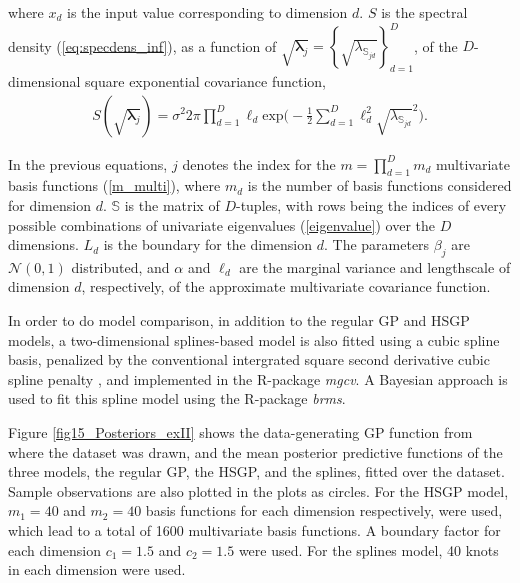 \documentclass[]{interact}
\theoremstyle{plain}%
\theoremstyle{definition}
\theoremstyle{remark}
\begin{document}
\noindent where $x_d$ is the input value corresponding to dimension $d$. $S$ is the spectral density (\ref{eq:specdens_inf}), as a function of $\sqrt{\bm{\lambda}_j}= \left\{ \sqrt{\lambda_{\mathbb{S}_{jd}}} \right\}_{d=1}^{D}$, of the $D$-dimensional square exponential covariance function,
%
\begin{eqnarray*}
S(\sqrt{\bm{\lambda}_j})= \sigma^2 2\pi \prod_{d=1}^D \ell_d  \mathrm{exp}\bigg(-\frac{1}{2} \sum_{d=1}^D \ell_d^2  \sqrt{\lambda_{\mathbb{S}_{jd}}}^2 \bigg). 
\end{eqnarray*}

\noindent In the previous equations, $j$ denotes the index for the $m= \prod_{d=1}^{D} m_d$ multivariate basis functions (\ref{m_multi}), where $m_d$ is the number of basis functions considered for dimension $d$. $\mathbb{S}$ is the matrix of $D$-tuples, with rows being the indices of every possible combinations of univariate eigenvalues (\ref{eigenvalue}) over the $D$ dimensions. $L_d$ is the boundary for the dimension $d$. The parameters $\beta_j$ are $\mathcal{N}(0,1)$ distributed, and $\alpha$ and $\ell_d$ are the marginal variance and lengthscale of dimension $d$, respectively, of the approximate multivariate covariance function.


In order to do model comparison, in addition to the regular GP and HSGP models, a two-dimensional splines-based model is also fitted using a cubic spline basis, penalized by the conventional intergrated square second derivative cubic spline penalty \citep{wood2017generalized}, and implemented in the R-package \textit{mgcv}. A Bayesian approach is used to fit this spline model using the R-package \textit{brms}.

Figure \ref{fig15_Posteriors_exII} shows the data-generating GP function from where the dataset was drawn, and the mean posterior predictive functions of the three models, the regular GP, the HSGP, and the splines, fitted over the dataset. Sample observations are also plotted in the plots as circles. For the HSGP model, $m_1=40$ and $m_2=40$ basis functions for each dimension respectively, were used, which lead to a total of 1600 multivariate basis functions. A boundary factor for each dimension $c_1=1.5$ and $c_2=1.5$ were used. For the splines model, 40 knots in each dimension were used.
\end{document}

